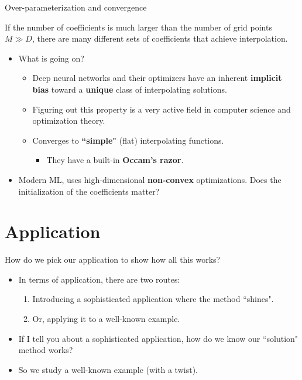 \documentclass[aspectratio=169,10pt]{beamer}
\newcommand{\emphcolor}[1]{\textbf{\textcolor{emphcolorval}{#1}}}
\begin{document}
\begin{frame}{Over-parameterization and convergence}

		If the number of coefficients is much larger than the number of grid points $M\gg D$, there are many different sets of coefficients that achieve interpolation.
		\begin{itemize}
		\item What is going on?  \vspace{0.1in}
		\begin{itemize}
			\item Deep neural networks and their optimizers have an inherent \emphcolor{implicit bias} toward a  \emphcolor{unique} class of interpolating solutions.\vspace{0.1in}
			\item Figuring out this property is a very active field in computer science and optimization theory.\vspace{0.1in}
			\item Converges to \emphcolor{``simple"} (flat) interpolating functions. \vspace{0.1in}
			\begin{itemize}
				\item They have a built-in \emphcolor{Occam's razor}.\vspace{0.1in}
			\end{itemize}
		\end{itemize}
	\item Modern ML, uses high-dimensional \emphcolor{non-convex} optimizations. Does the initialization of the coefficients matter? 
	\end{itemize}		 

\end{frame}	


		\section{Application}
		
		\begin{frame}{How do we pick our application to show how all this works?}
			\begin{itemize}
				\item In terms of application, there are two routes:\vspace{0.1in}
				\begin{enumerate}
					\item Introducing a sophisticated application where the method ``shines".\vspace{0.1in}
					\item Or, applying it to a well-known example.\vspace{0.1in} 
				\end{enumerate}
			\item If I tell you about a sophisticated application, how do we know our ``solution" method works?\vspace{0.1in}
			\item So we study a well-known example (with a twist).\vspace{0.1in}		
			\end{itemize}
		\end{frame}
		
\end{document}
